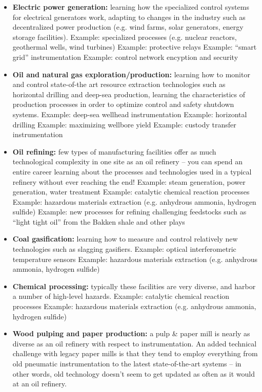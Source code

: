 \begin{itemize}
\item{} {\bf Electric power generation:} learning how the specialized control systems for electrical generators work, adapting to changes in the industry such as decentralized power production (e.g. wind farms, solar generators, energy storage facilities).
\itemitem{} Example: specialized processes (e.g. nuclear reactors, geothermal wells, wind turbines)
\itemitem{} Example: protective relays
\itemitem{} Example: ``smart grid'' instrumentation
\itemitem{} Example: control network encyption and security
\item{} {\bf Oil and natural gas exploration/production:} learning how to monitor and control state-of-the art resource extraction technologies such as horizontal drilling and deep-sea production, learning the characteristics of production processes in order to optimize control and safety shutdown systems.
\itemitem{} Example: deep-sea wellhead instrumentation
\itemitem{} Example: horizontal drilling
\itemitem{} Example: maximizing wellbore yield
\itemitem{} Example: custody transfer instrumentation
\item{} {\bf Oil refining:} few types of manufacturing facilities offer as much technological complexity in one site as an oil refinery -- you can spend an entire career learning about the processes and technologies used in a typical refinery without ever reaching the end!
\itemitem{} Example: steam generation, power generation, water treatment
\itemitem{} Example: catalytic chemical reaction processes
\itemitem{} Example: hazardous materials extraction (e.g. anhydrous ammonia, hydrogen sulfide)
\itemitem{} Example: new processes for refining challenging feedstocks such as ``light tight oil'' from the Bakken shale and other plays
\item{} {\bf Coal gasification:} learning how to measure and control relatively new technologies such as slagging gasifiers.
\itemitem{} Example: optical interferometric temperature sensors
\itemitem{} Example: hazardous materials extraction (e.g. anhydrous ammonia, hydrogen sulfide)
\item{} {\bf Chemical processing:} typically these facilities are very diverse, and harbor a number of high-level hazards.
\itemitem{} Example: catalytic chemical reaction processes
\itemitem{} Example: hazardous materials extraction (e.g. anhydrous ammonia, hydrogen sulfide)
\item{} {\bf Wood pulping and paper production:} a pulp \& paper mill is nearly as diverse as an oil refinery with respect to instrumentation.  An added technical challenge with legacy paper mills is that they tend to employ everything from old pneumatic instrumentation to the latest state-of-the-art systems -- in other words, old technology doesn't seem to get updated as often as it would at an oil refinery.

\end{itemize}
